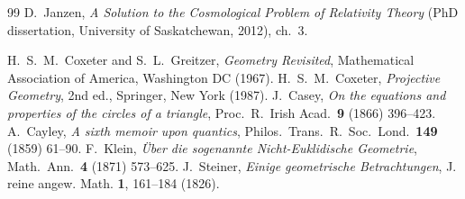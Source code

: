 \documentclass[11pt,a4paper]{article}
\theoremstyle{definition}
\begin{document}


\begin{thebibliography}{99}
 D.~Janzen, \emph{A Solution to the Cosmological
Problem of Relativity Theory} (PhD dissertation, University of Saskatchewan,
2012), ch.~3.

 H.~S.~M.~Coxeter and S.~L.~Greitzer, \emph{Geometry Revisited}, Mathematical Association of America, Washington DC (1967).
 H.~S.~M.~Coxeter, \emph{Projective Geometry}, 2nd ed., Springer, New York (1987).
 J.~Casey, \emph{On the equations and properties of the circles of a triangle}, Proc.\ R.\ Irish Acad.\ \textbf{9} (1866) 396--423.
 A.~Cayley, \emph{A sixth memoir upon quantics}, Philos.\ Trans.\ R.\ Soc.\ Lond.\ \textbf{149} (1859) 61--90.
 F.~Klein, \emph{\"Uber die sogenannte Nicht-Euklidische Geometrie}, Math.\ Ann.\ \textbf{4} (1871) 573--625.
 J.~Steiner, \emph{Einige geometrische Betrachtungen},
J. reine angew. Math. \textbf{1}, 161--184 (1826).


\end{thebibliography}
\end{document}
